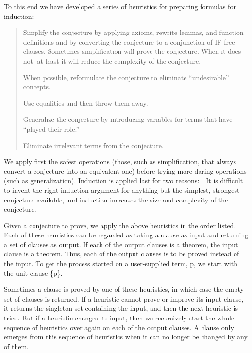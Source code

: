 \documentclass[11pt]{book}
\newenvironment{pubcrown}{\begin{quote}}{\end{quote}}
\begin{document}
To this end we have developed a series of heuristics for
preparing formulas for induction:
\begin{pubcrown}
Simplify the conjecture by applying axioms, rewrite lemmas, and
function definitions and by converting the conjecture to a
conjunction of IF-free clauses.  Sometimes simplification will prove
the conjecture.  When it does not, at least it will reduce
the complexity of the conjecture.

When possible, reformulate the conjecture to eliminate ``undesirable''
concepts.

Use equalities and then throw them away.

Generalize the conjecture by introducing variables for terms that
have ``played their role.''

Eliminate irrelevant terms from the conjecture.
\end{pubcrown}
We apply first the safest operations (those, such as simplification,
that always convert a conjecture into an equivalent one)
before trying more daring operations  (such as generalization).
Induction is  applied last for two reasons:~~It is difficult
to invent the right induction argument for anything but the
simplest, strongest conjecture available, and induction 
increases the size and complexity of the conjecture.

Given a conjecture to prove,
we apply the above heuristics in the order listed.  Each of these heuristics can be
regarded as taking a clause as input and returning a set of clauses as
output.  If each of the output clauses is a theorem, the input clause is a theorem.  Thus,
each of the output clauses is  to  be proved instead of the input.  To get the process
started on a user-supplied term, p, we start with the unit clause
\{p\}.

Sometimes a clause is proved by one of these heuristics,
in which case the empty set of clauses is returned.  If a heuristic
cannot prove or improve its input clause, it
returns the singleton set containing
the input, and then the next heuristic is tried.  But if a heuristic changes
its input, then we recursively start the whole sequence of heuristics
over again on each of the output clauses.
A clause only emerges from this sequence of heuristics when it
can no longer be changed by any of them.
\end{document}
